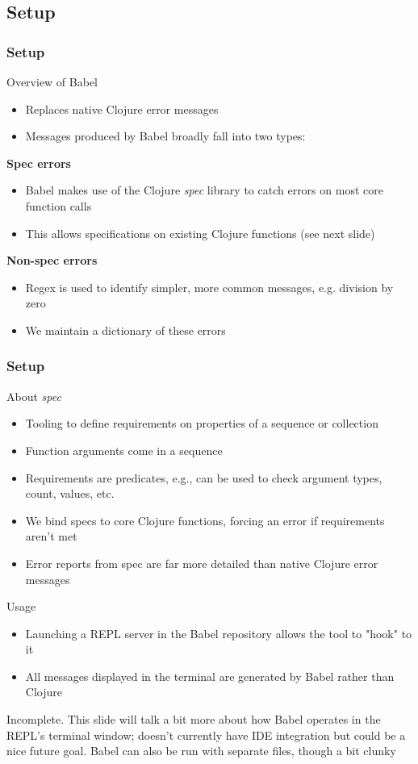 \documentclass{beamer}
\begin{document}
\subsection{Setup}
\begin{frame}
    \frametitle{Setup}
    Overview of Babel
    \begin{itemize}
        \item Replaces native Clojure error messages
        \item Messages produced by Babel broadly fall into two types:
    \end{itemize}
    \textbf{Spec errors}
    \begin{itemize}
        \item Babel makes use of the Clojure \textit{spec} library to catch errors on most core function calls
        \item This allows specifications on existing Clojure functions (see next slide)
    \end{itemize}
    \textbf{Non-spec errors}
    \begin{itemize}
        \item Regex is used to identify simpler, more common messages, e.g. division by zero
        \item We maintain a dictionary of these errors
    \end{itemize}
\end{frame}

\begin{frame}
    \frametitle{Setup}
    About \textit{spec}
    \begin{itemize}
        \item Tooling to define requirements on properties of a sequence or collection
        \item Function arguments come in a sequence
        \item Requirements are predicates, e.g., can be used to check argument types, count, values, etc.
        \item We bind specs to core Clojure functions, forcing an error if requirements aren't met
        \item Error reports from spec are far more detailed than native Clojure error messages
    \end{itemize}
\end{frame}

\begin{frame}
    Usage
    \begin{itemize}
        \item Launching a REPL server in the Babel repository allows the tool to "hook" to it
        \item All messages displayed in the terminal are generated by Babel rather than Clojure
    \end{itemize}
    Incomplete. This slide will talk a bit more about how Babel operates in the REPL's terminal window; doesn't currently have IDE integration but could be a nice future goal. Babel can also be run with separate files, though a bit clunky 
\end{frame}
\end{document}
